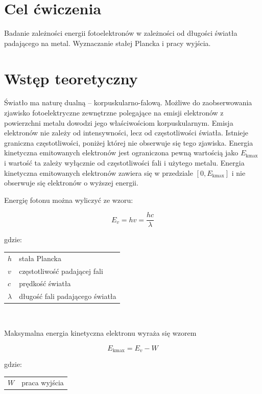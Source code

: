 \documentclass{fizykalab}
\makeatletter
\newenvironment{conditions}[1][gdzie:]
  {#1 \begin{tabular}[t]{>{$}l<{$} @{${} - {}$} l}}
  {\end{tabular}\\[\belowdisplayskip]}
\makeatother
\begin{document}
\maketitle

\section{Cel ćwiczenia}
Badanie zależności energii fotoelektronów w zależności od długości światła padającego na
metal. Wyznaczanie stałej Plancka i pracy wyjścia.

\section{Wstęp teoretyczny}
Światło ma naturę dualną – korpuskularno-falową. 
Możliwe do zaobserwowania zjawisko fotoelektryczne
zewnętrzne polegające na emisji elektronów z powierzchni metalu dowodzi jego właściwościom korpuskularnym.
Emisja elektronów nie zależy od
intensywności, lecz od częstotliwości światła. 
Istnieje graniczna częstotliwości,
poniżej której nie obserwuje się tego zjawiska.
Energia kinetyczna emitowanych elektronów jest ograniczona pewną wartością
jako $E_{\text{kmax}}$ i wartość
ta zależy wyłącznie od częstotliwości fali i użytego metalu.
Energia kinetyczna emitowanych
elektronów zawiera się w przedziale $[0, E_{\text{kmax}}]$ i nie obserwuje się elektronów o wyższej energii.

Energię fotonu można wyliczyć ze wzoru:

\begin{equation}
    E_{v} = hv = \frac{hc}{\lambda}
\end{equation}

\begin{conditions}
    h & stała Plancka \\
    v & częstotliwość padającej fali \\
    c & prędkość światła \\
    \lambda & długość fali padającego światła
\end{conditions}

Maksymalna energia kinetyczna elektronu wyraża się wzorem

\begin{equation}
    E_{\text{kmax}} = E_v - W 
\end{equation}

\begin{conditions}
    W & praca wyjścia
\end{conditions}
\end{document}
